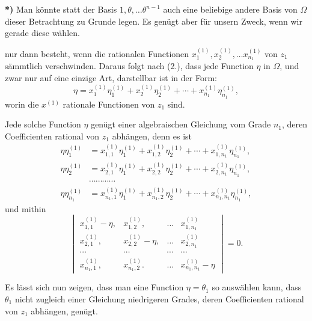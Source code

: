 \documentclass{article}
\begin{document}
\textbf{*)} Man könnte statt der Basis $1, \theta, \ldots \theta^{n-1}$ auch eine beliebige andere Basis von $\Omega$ dieser Betrachtung zu Grunde legen. Es genügt aber für unsern Zweck, wenn wir gerade diese wählen.

nur dann besteht, wenn die rationalen Functionen $x_{1}^{(1)}, x_{2}^{(1)}, \ldots x_{n_{1}}^{(1)}$ von $z_{1}$ sämmtlich verschwinden. Daraus folgt nach (2.), dass jede Function $\eta$ in $\Omega$, und zwar nur auf eine einzige Art, darstellbar ist in der Form:
\[ \eta = x_{1}^{(1)}\eta_{1}^{(1)} + x_{2}^{(1)}\eta_{2}^{(1)} + \cdots + x_{n_{1}}^{(1)}\eta_{n_{1}}^{(1)}, \]
worin die $x^{(1)}$ rationale Functionen von $z_{1}$ sind.

Jede solche Function $\eta$ genügt einer algebraischen Gleichung vom Grade $n_{1}$, deren Coefficienten rational von $z_{1}$ abhängen, denn es ist
\[ \begin{aligned} \eta\eta_{1}^{(1)} &= x_{1,1}^{(1)}\eta_{1}^{(1)} + x_{1,2}^{(1)}\eta_{2}^{(1)} + \cdots + x_{1,n_{1}}^{(1)}\eta_{n_{1}}^{(1)}, \\ \eta\eta_{2}^{(1)} &= x_{2,1}^{(1)}\eta_{1}^{(1)} + x_{2,2}^{(1)}\eta_{2}^{(1)} + \cdots + x_{2,n_{1}}^{(1)}\eta_{n_{1}}^{(1)}, \\ &\cdots\cdots\cdots\cdots \\ \eta\eta_{n_{1}}^{(1)} &= x_{n_{1},1}^{(1)}\eta_{1}^{(1)} + x_{n_{1},2}^{(1)}\eta_{2}^{(1)} + \cdots + x_{n_{1},n_{1}}^{(1)}\eta_{n_{1}}^{(1)}, \end{aligned} \]
und mithin
\[ \begin{vmatrix} x_{1,1}^{(1)} - \eta, & x_{1,2}^{(1)}, & \ldots & x_{1,n_{1}}^{(1)} \\ x_{2,1}^{(1)}, & x_{2,2}^{(1)} - \eta, & \ldots & x_{2,n_{1}}^{(1)} \\ \cdots & \cdots & \cdots & \cdots \\ x_{n_{1},1}^{(1)}, & x_{n_{1},2}^{(1)}. & \ldots & x_{n_{1},n_{1}}^{(1)} - \eta \end{vmatrix} = 0. \]

Es lässt sich nun zeigen, dass man eine Function $\eta = \theta_{1}$ so auswählen kann, dass $\theta_{1}$ nicht zugleich einer Gleichung niedrigeren Grades, deren Coefficienten rational von $z_{1}$ abhängen, genügt.
\end{document}
